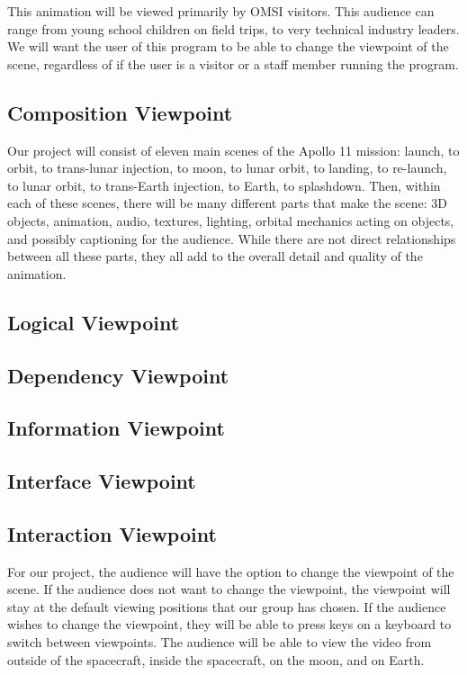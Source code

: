 \documentclass[onecolumn, draftclsnofoot,10pt, compsoc]{IEEEtran}
\begin{document}
    This animation will be viewed primarily by OMSI visitors. This audience can range from young school children on field trips, to very technical industry leaders. We will want the user of this program to be able to change the viewpoint of the scene, regardless of if the user is a visitor or a staff member running the program.  
    
    \subsection{Composition Viewpoint}
    
    Our project will consist of eleven main scenes of the Apollo 11 mission: launch, to orbit, to trans-lunar injection, to moon, to lunar orbit, to landing, to re-launch, to lunar orbit, to trans-Earth injection, to Earth, to splashdown. Then, within each of these scenes, there will be many different parts that make the scene: 3D objects, animation, audio, textures, lighting, orbital mechanics acting on objects, and possibly captioning for the audience. While there are not direct relationships between all these parts, they all add to the overall detail and quality of the animation. 
    
    \subsection{Logical Viewpoint}
    
    \subsection{Dependency Viewpoint}
    
    \subsection{Information Viewpoint}

    \subsection{Interface Viewpoint}
        
    \subsection{Interaction Viewpoint}
    For our project, the audience will have the option to change the viewpoint of the scene. If the audience does not want to change the viewpoint, the viewpoint will stay at the default viewing positions that our group has chosen. If the audience wishes to change the viewpoint, they will be able to press keys on a keyboard to switch between viewpoints. The audience will be able to view the video from outside of the spacecraft, inside the spacecraft, on the moon, and on Earth.
    
\end{document}
